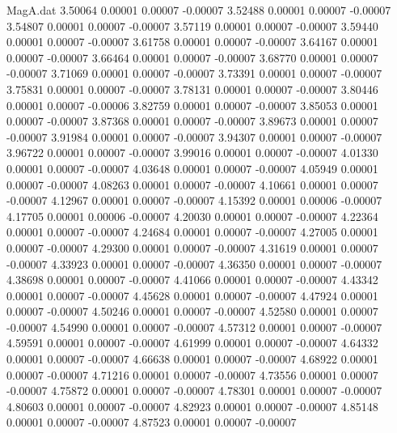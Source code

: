 \begin{filecontents}{MagA.dat}
   3.50064    0.00001    0.00007   -0.00007
   3.52488    0.00001    0.00007   -0.00007
   3.54807    0.00001    0.00007   -0.00007
   3.57119    0.00001    0.00007   -0.00007
   3.59440    0.00001    0.00007   -0.00007
   3.61758    0.00001    0.00007   -0.00007
   3.64167    0.00001    0.00007   -0.00007
   3.66464    0.00001    0.00007   -0.00007
   3.68770    0.00001    0.00007   -0.00007
   3.71069    0.00001    0.00007   -0.00007
   3.73391    0.00001    0.00007   -0.00007
   3.75831    0.00001    0.00007   -0.00007
   3.78131    0.00001    0.00007   -0.00007
   3.80446    0.00001    0.00007   -0.00006
   3.82759    0.00001    0.00007   -0.00007
   3.85053    0.00001    0.00007   -0.00007
   3.87368    0.00001    0.00007   -0.00007
   3.89673    0.00001    0.00007   -0.00007
   3.91984    0.00001    0.00007   -0.00007
   3.94307    0.00001    0.00007   -0.00007
   3.96722    0.00001    0.00007   -0.00007
   3.99016    0.00001    0.00007   -0.00007
   4.01330    0.00001    0.00007   -0.00007
   4.03648    0.00001    0.00007   -0.00007
   4.05949    0.00001    0.00007   -0.00007
   4.08263    0.00001    0.00007   -0.00007
   4.10661    0.00001    0.00007   -0.00007
   4.12967    0.00001    0.00007   -0.00007
   4.15392    0.00001    0.00006   -0.00007
   4.17705    0.00001    0.00006   -0.00007
   4.20030    0.00001    0.00007   -0.00007
   4.22364    0.00001    0.00007   -0.00007
   4.24684    0.00001    0.00007   -0.00007
   4.27005    0.00001    0.00007   -0.00007
   4.29300    0.00001    0.00007   -0.00007
   4.31619    0.00001    0.00007   -0.00007
   4.33923    0.00001    0.00007   -0.00007
   4.36350    0.00001    0.00007   -0.00007
   4.38698    0.00001    0.00007   -0.00007
   4.41066    0.00001    0.00007   -0.00007
   4.43342    0.00001    0.00007   -0.00007
   4.45628    0.00001    0.00007   -0.00007
   4.47924    0.00001    0.00007   -0.00007
   4.50246    0.00001    0.00007   -0.00007
   4.52580    0.00001    0.00007   -0.00007
   4.54990    0.00001    0.00007   -0.00007
   4.57312    0.00001    0.00007   -0.00007
   4.59591    0.00001    0.00007   -0.00007
   4.61999    0.00001    0.00007   -0.00007
   4.64332    0.00001    0.00007   -0.00007
   4.66638    0.00001    0.00007   -0.00007
   4.68922    0.00001    0.00007   -0.00007
   4.71216    0.00001    0.00007   -0.00007
   4.73556    0.00001    0.00007   -0.00007
   4.75872    0.00001    0.00007   -0.00007
   4.78301    0.00001    0.00007   -0.00007
   4.80603    0.00001    0.00007   -0.00007
   4.82923    0.00001    0.00007   -0.00007
   4.85148    0.00001    0.00007   -0.00007
   4.87523    0.00001    0.00007   -0.00007

\end{filecontents}
